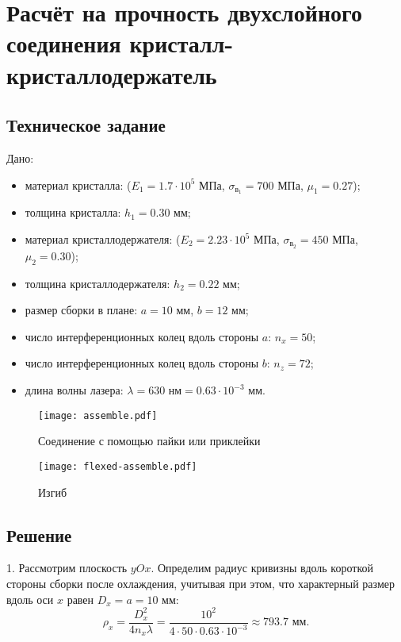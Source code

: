 \chapter{Расчёт на прочность двухслойного соединения кристалл-кристаллодержатель}

\section{Техническое задание}

Дано: 
\begin{itemize}
    \item материал кристалла:
         ($E_1 = 1.7 \cdot 10^5 \text{ МПа}$, $\sigma_{в_1} = 700 \text{ МПа}$, $\mu_1 = 0.27$);
    \item толщина кристалла:
        $h_1 = 0.30 \text{ мм}$;
    \item материал кристаллодержателя:
         ($E_2 = 2.23 \cdot 10^5 \text{ МПа}$, $\sigma_{в_2} = 450 \text{ МПа}$, $\mu_2 = 0.30$);
    \item толщина кристаллодержателя:
        $h_2 = 0.22 \text{ мм}$;
    \item размер сборки в плане:
        $a = 10 \text{ мм}$, $b = 12 \text{ мм}$;
    \item число интерференционных колец вдоль стороны $a$:
        $n_x = 50$;
    \item число интерференционных колец вдоль стороны $b$:
        $n_z = 72$;
    \item длина волны лазера:
        $\lambda = 630 \text{ нм} = 0.63 \cdot 10^{-3} \text{ мм}$.
\end{itemize}

\begin{figure}[h]
    \centering
    \texttt{[image: assemble.pdf]}
    \caption{Соединение с помощью пайки или приклейки}
\end{figure}

\begin{figure}[h]
    \centering
    \texttt{[image: flexed-assemble.pdf]}
    \caption{Изгиб}
\end{figure}

\section{Решение}

1. Рассмотрим плоскость $yOx$. Определим радиус кривизны вдоль короткой стороны сборки после охлаждения, учитывая при этом, что характерный размер вдоль оси $x$ равен $D_x = a = 10 \text{ мм}$:
\[
    \rho_x = \frac{D_x^2}{4 n_x \lambda} = \frac{10^2}{4 \cdot 50 \cdot 0.63 \cdot 10^{-3}} \approx 793.7 \text{ мм}.
\]

